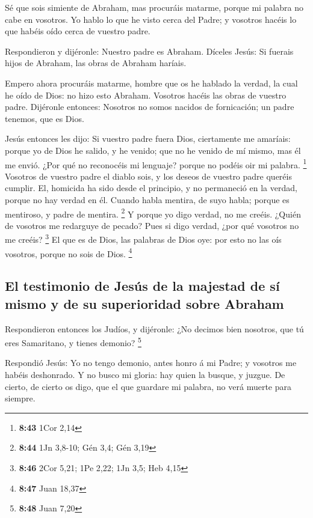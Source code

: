  Sé que sois simiente de Abraham, mas procuráis matarme,
porque mi palabra no cabe en vosotros.  Yo hablo lo que
he visto cerca del Padre; y vosotros hacéis lo que habéis oído cerca de
vuestro padre.

 Respondieron y dijéronle: Nuestro padre es Abraham.
Díceles Jesús: Si fuerais hijos de Abraham, las obras de Abraham
haríais.

 Empero ahora procuráis matarme, hombre que os he hablado
la verdad, la cual he oído de Dios: no hizo esto Abraham.
 Vosotros hacéis las obras de vuestro padre. Dijéronle
entonces: Nosotros no somos nacidos de fornicación; un padre tenemos,
que es Dios.

 Jesús entonces les dijo: Si vuestro padre fuera Dios,
ciertamente me amaríais: porque yo de Dios he salido, y he venido; que
no he venido de mí mismo, mas él me envió.  ¿Por qué no
reconocéis mi lenguaje? porque no podéis oir mi palabra. \footnote{\textbf{8:43}
  1Cor 2,14}  Vosotros de vuestro padre el diablo sois, y
los deseos de vuestro padre queréis cumplir. El, homicida ha sido desde
el principio, y no permaneció en la verdad, porque no hay verdad en él.
Cuando habla mentira, de suyo habla; porque es mentiroso, y padre de
mentira. \footnote{\textbf{8:44} 1Jn 3,8-10; Gén 3,4; Gén 3,19}
 Y porque yo digo verdad, no me creéis. 
¿Quién de vosotros me redarguye de pecado? Pues si digo verdad, ¿por qué
vosotros no me creéis? \footnote{\textbf{8:46} 2Cor 5,21; 1Pe 2,22; 1Jn
  3,5; Heb 4,15}  El que es de Dios, las palabras de Dios
oye: por esto no las oís vosotros, porque no sois de Dios. \footnote{\textbf{8:47}
  Juan 18,37}

\hypertarget{el-testimonio-de-jesuxfas-de-la-majestad-de-suxed-mismo-y-de-su-superioridad-sobre-abraham}{%
\subsection{El testimonio de Jesús de la majestad de sí mismo y de su
superioridad sobre
Abraham}\label{el-testimonio-de-jesuxfas-de-la-majestad-de-suxed-mismo-y-de-su-superioridad-sobre-abraham}}

 Respondieron entonces los Judíos, y dijéronle: ¿No
decimos bien nosotros, que tú eres Samaritano, y tienes demonio?
\footnote{\textbf{8:48} Juan 7,20}

 Respondió Jesús: Yo no tengo demonio, antes honro á mi
Padre; y vosotros me habéis deshonrado.  Y no busco mi
gloria: hay quien la busque, y juzgue.  De cierto, de
cierto os digo, que el que guardare mi palabra, no verá muerte para
siempre.

